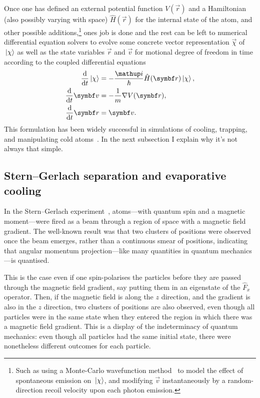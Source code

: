 Once one has defined an external potential function $V(\vec r)$ and a Hamiltonian (also possibly varying with space) $\hat H(\vec r)$ for the internal state of the atom, and other possible additions,\footnote{Such as using a Monte-Carlo wavefunction method~\cite{Molmer:93, RevModPhys.70.101} to model the effect of spontaneous emission on $\ket\chi$, and modifying $\vec v$ instantaneously by a random-direction recoil velocity upon each photon emission.} ones job is done and the rest can be left to numerical differential equation solvers to evolve some concrete vector representation $\vec\chi$ of $\ket\chi$ as well as the state variables $\vec r$ and $\vec v$ for motional degree of freedom in time according to the coupled differential equations
\begin{align}\label{eq:simple_semiclassical_first}
\dv{t}\ket\chi &= -\frac\ii\hbar \hat H(\vec r)\ket\chi,\\
\dv{t}\vec v &= -\frac1m\nabla V(\vec r),\\
\dv{t}\vec r &= \vec v\label{eq:simple_semiclassical_last}.
\end{align}
This formulation has been widely successful in simulations of cooling, trapping, and manipulating cold atoms~\cite{mcclelland_atom-optical_1995, wallis_quantum_1995, adams_laser_1997, stenholm_semiclassical_1986, minogin_laser_1987}. In the next subsection I explain why it's not always that simple.

\subsection{Stern--Gerlach separation and evaporative cooling}\label{sec:sterngerlachseparation}

In the Stern--Gerlach experiment~\cite{gerlach_experimentelle_1922}, atoms---with quantum spin and a magnetic moment---were fired as a beam through a region of space with a magnetic field gradient. The well-known result was that two clusters of positions were observed once the beam emerges, rather than a continuous smear of positions, indicating that angular momentum projection---like many quantities in quantum mechanics---is quantised.

This is the case even if one spin-polarises the particles before they are passed through the magnetic field gradient, say putting them in an eigenstate of the $\hat F_x$ operator. Then, if the magnetic field is along the $z$ direction, and the gradient is also in the $z$ direction, two clusters of positions are also observed, even though all particles were in the same state when they entered the region in which there was a magnetic field gradient. This is a display of the indeterminacy of quantum mechanics: even though all particles had the same initial state, there were nonetheless different outcomes for each particle.

